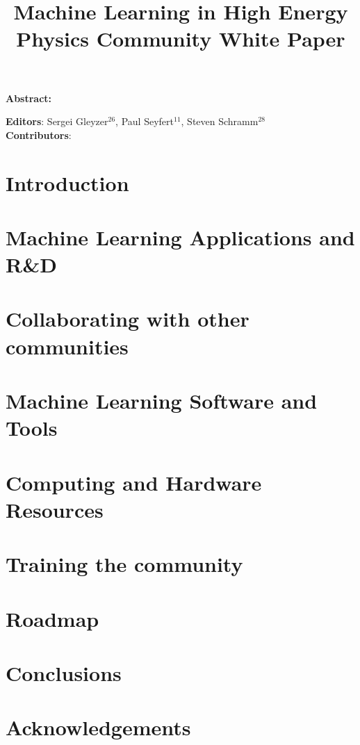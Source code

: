 \documentclass{article}
\begin{document}
\title{Machine Learning in High Energy Physics Community White Paper}

\maketitle

\setlength\parindent{0pt}
\textbf{Abstract:}

\vskip 1cm
\textbf{Editors}: Sergei Gleyzer$^{26}$, Paul Seyfert$^{11}$, Steven Schramm$^{28}$\\
\newline
\textbf{Contributors}:


\tableofcontents
\clearpage

\section{Introduction}
\label{sec:introduction}


\section{Machine Learning Applications and R\&D}
\label{sec:applications}


\section{Collaborating with other communities}
\label{sec:collaboration}


\section{Machine Learning Software and Tools}
\label{sec:software}


\section{Computing and Hardware Resources}
\label{sec:resources}


\section{Training the community}
\label{sec:training}


\section{Roadmap}
\label{sec:roadmap}


\section{Conclusions}
\label{sec:conclusions}


\section{Acknowledgements}
\label{sec:acknowledgements}


\appendix

\clearpage

\printbibliography[title={References}]
\end{document}
